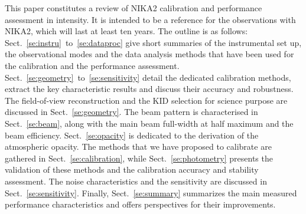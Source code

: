This paper constitutes a review of NIKA2 calibration and
performance assessment in intensity. It is intended to be a reference
for the observations with NIKA2, which will last at least ten years. 
The outline is as follows:
Sect.~\ref{se:instru}~to~\ref{se:dataproc} give short summaries of the
instrumental set up, the observational modes and the data analysis methods
that have been used for the calibration and the performance
assessment. Sect.~\ref{se:geometry}~to~\ref{se:sensitivity} detail the
dedicated calibration methods, extract the key characteristic results
and discuss their accuracy and robustness. The field-of-view
reconstruction and the KID selection for science purpose are discussed
in Sect.~\ref{se:geometry}. The beam pattern is characterised in
Sect.~\ref{se:beam}, along with the main beam
full-width at half maximum and the beam
efficiency. Sect.~\ref{se:opacity} is dedicated to the derivation of
the atmospheric opacity. The methods that we have proposed to
calibrate are gathered in Sect.~\ref{se:calibration}, while
Sect.~\ref{se:photometry} presents the validation of these methods and
the calibration accuracy and stability assessment. The noise
characteristics and the sensitivity are discussed in
Sect.~\ref{se:sensitivity}. Finally, Sect.~\ref{se:summary} summarizes
the main measured performance characteristics and offers perspectives
for their improvements. 















